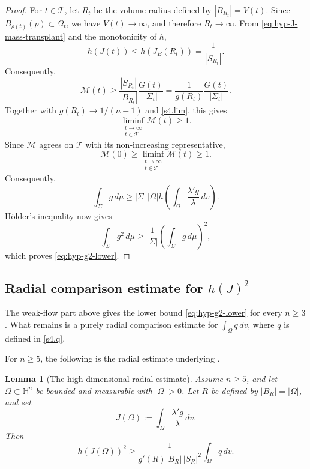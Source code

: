 \documentclass[11pt,reqno]{amsart}
\numberwithin{equation}{section}
\newtheorem{lemma}[theorem]{Lemma}
\theoremstyle{definition}
\newcommand{\HH}{\mathbb H}
\begin{document}
\begin{proof}
For $t\in\mathcal T$, let $R_t$ be the volume radius defined by $|B_{R_t}|=V(t)$. Since $B_{\rho(t)}(p)\subset\Omega_t$, we have
$V(t)\to\infty$, and therefore $R_t\to\infty$. From \eqref{eq:hyp-J-mass-transplant} and the monotonicity of $h$,
\begin{equation*}
    h(J(t))\leq h(J_B(R_t))=\frac1{|S_{R_t}|}.
\end{equation*}
Consequently,
\begin{equation*}
    \mathcal M(t)
    \geq
    \frac{|S_{R_t}|}{|B_{R_t}|}\frac{G(t)}{|\Sigma_t|}
    =\frac1{g(R_t)}\frac{G(t)}{|\Sigma_t|}.
\end{equation*}
Together with $g(R_t)\to1/(n-1)$ and \eqref{s4.lim}, this gives
\begin{equation*}
    \liminf_{\substack{t\to\infty\\t\in\mathcal T}}\mathcal M(t)\geq1.
\end{equation*}
Since $\mathcal M$ agrees on $\mathcal T$ with its non-increasing representative,
\begin{equation*}
\mathcal M(0)\geq\liminf_{\substack{t\to\infty\\ t\in\mathcal T}}\mathcal M(t)\geq 1.
\end{equation*}
Consequently,
\begin{equation*}
    \int_\Sigma g\,d\mu
    \geq
    |\Sigma|\,|\Omega|h\left(\int_\Omega \frac{\lambda'g}{\lambda}\,dv\right).
\end{equation*}
H\"older's inequality now gives
\begin{equation*}
    \int_\Sigma g^2\,d\mu
    \geq\frac1{|\Sigma|}\left(\int_\Sigma g\,d\mu\right)^2,
\end{equation*}
which proves \eqref{eq:hyp-g2-lower}.
\end{proof}

\subsection{Radial comparison estimate for $h(J)^2$}
\label{subsec:radial}

The weak-flow part above gives the lower bound \eqref{eq:hyp-g2-lower} for every $n\geq3$.  What remains is a purely radial comparison estimate for $\int_\Omega q\,dv$, where $q$ is defined in \eqref{s4.q}.  

For $n\geq5$, the following is the radial estimate underlying \cite[Lemmas~4.4 and~4.5]{GuLiWan2025}.

\begin{lemma}[The high-dimensional radial estimate]\label{lem:hyp-h2-high}
Assume $n\geq5$, and let $\Omega\subset\HH^n$ be bounded and measurable with $|\Omega|>0$.  Let $R$ be defined by $|B_R|=|\Omega|$, and set
\begin{equation*}
    J(\Omega):=\int_\Omega\frac{\lambda'g}{\lambda}\,dv.
\end{equation*}
Then
\begin{equation}\label{eq:hyp-h2-bound-nge5}
    h(J(\Omega))^2
    \geq
    \frac{1}{g'(R)|B_R|\,|S_R|^2}
    \int_\Omega q\,dv.
\end{equation}
\end{lemma}
\end{document}
